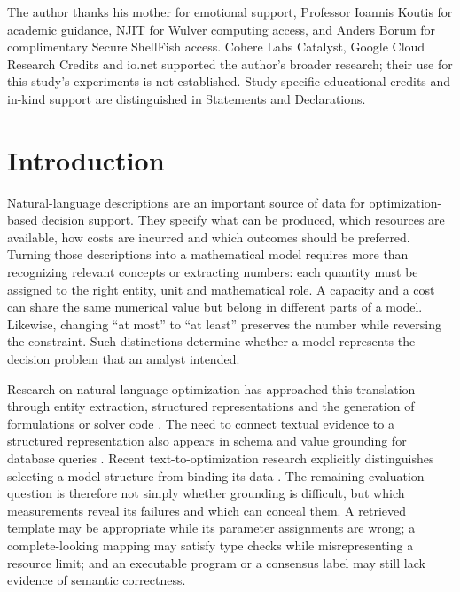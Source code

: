 \documentclass[pdflatex,iicol,sn-basic,Numbered]{sn-jnl}
\begin{document}
\maketitle



The author thanks his mother for emotional support, Professor Ioannis Koutis for academic guidance, NJIT for Wulver computing access, and Anders Borum for complimentary Secure ShellFish access. Cohere Labs Catalyst, Google Cloud Research Credits and io.net supported the author's broader research; their use for this study's experiments is not established. Study-specific educational credits and in-kind support are distinguished in Statements and Declarations.

\section{Introduction}

Natural-language descriptions are an important source of data for optimization-based decision support. They specify what can be produced, which resources are available, how costs are incurred and which outcomes should be preferred. Turning those descriptions into a mathematical model requires more than recognizing relevant concepts or extracting numbers: each quantity must be assigned to the right entity, unit and mathematical role. A capacity and a cost can share the same numerical value but belong in different parts of a model. Likewise, changing ``at most'' to ``at least'' preserves the number while reversing the constraint. Such distinctions determine whether a model represents the decision problem that an analyst intended.

Research on natural-language optimization has approached this translation through entity extraction, structured representations and the generation of formulations or solver code \cite{ramamonjison2022autoformulation,ramamonjison2023nl4opt,kadioglu2024ner4opt,ahmaditeshnizi2024optimus_icml}. The need to connect textual evidence to a structured representation also appears in schema and value grounding for database queries \cite{deng2021strug}. Recent text-to-optimization research explicitly distinguishes selecting a model structure from binding its data \cite{gao2026models}. The remaining evaluation question is therefore not simply whether grounding is difficult, but which measurements reveal its failures and which can conceal them. A retrieved template may be appropriate while its parameter assignments are wrong; a complete-looking mapping may satisfy type checks while misrepresenting a resource limit; and an executable program or a consensus label may still lack evidence of semantic correctness.
\end{document}
